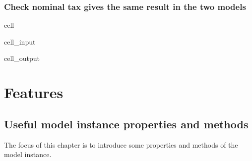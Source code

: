 \documentclass[letterpaper,10pt,english]{jupyterBook}
\begin{document}
\section{Check nominal tax gives the same result in the two models}
\label{\detokenize{content/howto/modifymodel/create_real_model:check-nominal-tax-gives-the-same-result-in-the-two-models}}
\begin{sphinxuseclass}{cell}\begin{sphinxVerbatimInput}

\begin{sphinxuseclass}{cell_input}
\begin{sphinxVerbatim}[commandchars=\\\{\}]
 
\end{sphinxVerbatim}

\end{sphinxuseclass}\end{sphinxVerbatimInput}
\begin{sphinxVerbatimOutput}

\begin{sphinxuseclass}{cell_output}
\noindent{}

\end{sphinxuseclass}\end{sphinxVerbatimOutput}

\end{sphinxuseclass}
\sphinxstepscope


\part{Features}

\sphinxstepscope


\chapter{Useful model instance properties and methods}
\label{\detokenize{content/Python/modelflow_features:useful-model-instance-properties-and-methods}}\label{\detokenize{content/Python/modelflow_features::doc}}
\sphinxAtStartPar
The focus of this chapter is to introduce some properties and methods of the model instance.
\end{document}
